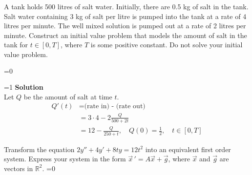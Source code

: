 \documentclass[12pt]{exam}
\newcommand{\sol}{1} %
\begin{document}
\begin{questions}
{        %
        
        

    }    
    \fi
    
 	\newpage\Initials
    \question[4] A tank holds 500 litres of salt water. Initially, there are 0.5 kg of salt in the tank. Salt water containing 3 kg of salt per litre is pumped into the tank at a rate of 4 litres per minute. The well mixed solution is pumped out at a rate of 2 litres per minute. Construct an initial value problem that models the amount of salt in the tank for $t\in[0,T]$, where $T$ is some positive constant. Do not solve your initial value problem. 
    
    \ifnum \sol=0 
    {
    \vspace{5cm}
    }
    \fi
    
    \ifnum \sol=1
    {\color{DarkBlue} \textbf{Solution}\\   
    Let $Q$ be the amount of salt at time $t$. 
    \begin{align*}
        Q'(t) &= \text{(rate in) - (rate out)} \\ 
        &= 3\cdot4 - 2\frac{Q}{500+2t} \\
        &= 12 - \frac{Q}{250+t}, \quad Q(0) = \frac12, \quad t \in [0,T]
    \end{align*}
    }
    \fi
    

    \question[3] Transform the equation $\displaystyle 2y'' + 4 y' + 8ty = 12t^2$ into an equivalent first order system. Express your system in the form $\vec x \, ' = A \vec x + \vec g$, where $\vec x$ and $\vec g$ are vectors in $\mathbb R^2$. 
    \ifnum \sol=0 
    {
    \vspace{4cm}
    }
    \fi    
    

\end{questions}
\end{document}
